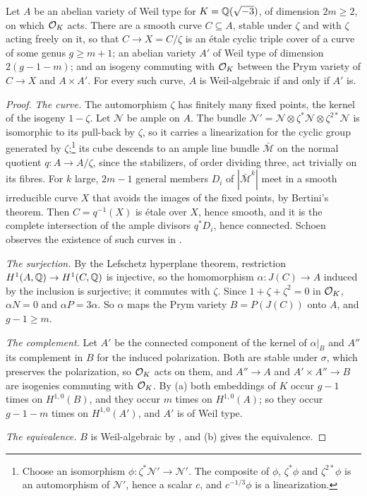 \begin{theorem}\label{thm:transfer}
Let $A$ be an abelian variety of Weil type for $K=\mathbb{Q}(\sqrt{-3})$, of
dimension $2m\ge2$, on which $\mathcal{O}_{K}$ acts. There are a smooth curve
$C\subseteq A$, stable under $\zeta$ and with $\zeta$ acting freely on it, so
that $C\to X=C/\zeta$ is an \'etale cyclic triple cover of a curve of some
genus $g\ge m+1$; an abelian variety $A'$ of Weil type of dimension
$2(g-1-m)$; and an isogeny commuting with $\mathcal{O}_{K}$ between the Prym variety
of $C\to X$ and $A\times A'$. For every such curve, $A$ is Weil-algebraic if
and only if $A'$ is.
\end{theorem}

\begin{proof}
\emph{The curve.} The automorphism $\zeta$ has finitely many fixed points,
the kernel of the isogeny $1-\zeta$. Let $\mathcal{N}$ be ample on $A$. The bundle $\mathcal{N}'=\mathcal{N}\otimes\zeta^{*}\mathcal{N}\otimes
\zeta^{2*}\mathcal{N}$ is isomorphic to its pull-back by $\zeta$, so it carries a linearization for the
cyclic group generated by $\zeta$;\footnote{Choose an isomorphism
$\phi\colon\zeta^{*}\mathcal{N}'\to\mathcal{N}'$. The composite of $\phi$,
$\zeta^{*}\phi$ and $\zeta^{2*}\phi$ is an automorphism of $\mathcal{N}'$,
hence a scalar $c$, and $c^{-1/3}\phi$ is a linearization.} its cube
descends to an ample line bundle $\bar{\mathcal{M}}$ on the normal quotient
$q\colon A\to A/\zeta$, since the stabilizers, of order dividing three, act
trivially on its fibres. For $k$ large, $2m-1$ general members $D_{i}$ of
$|\bar{\mathcal{M}}^{k}|$ meet in a smooth irreducible curve $X$ that avoids
the images of the fixed points, by Bertini's theorem. Then $C=q^{-1}(X)$ is
\'etale over $X$, hence smooth, and it is the complete intersection of the
ample divisors $q^{*}D_{i}$, hence connected. Schoen observes the existence
of such curves in \cite[\S3]{Sch88}.

\emph{The surjection.} By the Lefschetz hyperplane theorem, restriction
$H^{1}(A,\mathbb{Q})\to H^{1}(C,\mathbb{Q})$ is injective, so the homomorphism
$\alpha\colon J(C)\to A$ induced by the inclusion is surjective; it commutes
with $\zeta$. Since $1+\zeta+\zeta^{2}=0$ in $\mathcal{O}_{K}$, $\alpha N=0$ and
$\alpha P=3\alpha$. So $\alpha$ maps the Prym variety $B=P(J(C))$ onto $A$,
and $g-1\ge m$.

\emph{The complement.} Let $A'$ be the connected component of the kernel of
$\alpha|_{B}$ and $A''$ its complement in $B$ for the induced polarization.
Both are stable under $\sigma$, which preserves the polarization, so
$\mathcal{O}_{K}$ acts on them, and $A''\to A$ and $A'\times A''\to B$ are isogenies
commuting with $\mathcal{O}_{K}$. By (a) both embeddings of $K$ occur
$g-1$ times on $H^{1,0}(B)$, and they occur $m$ times on $H^{1,0}(A)$; so
they occur $g-1-m$ times on $H^{1,0}(A')$, and $A'$ is of Weil type.

\emph{The equivalence.} $B$ is Weil-algebraic by , and
(b) gives the equivalence.
\end{proof}

